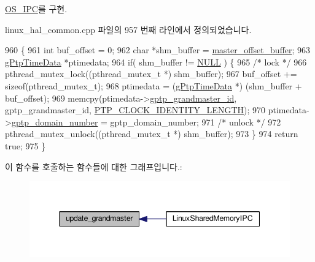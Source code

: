 \hyperlink{class_o_s___i_p_c_a322c3dc7306144448f366a525f634fdf}{O\+S\+\_\+\+I\+PC}를 구현.



linux\+\_\+hal\+\_\+common.\+cpp 파일의 957 번째 라인에서 정의되었습니다.


\begin{DoxyCode}
960 \{
961     \textcolor{keywordtype}{int} buf\_offset = 0;
962     \textcolor{keywordtype}{char} *shm\_buffer = \hyperlink{class_linux_shared_memory_i_p_c_a028459163bd8b988344f6837036cb0be}{master\_offset\_buffer};
963     \hyperlink{structg_ptp_time_data}{gPtpTimeData} *ptimedata;
964     \textcolor{keywordflow}{if}( shm\_buffer != \hyperlink{openavb__types__base__pub_8h_a070d2ce7b6bb7e5c05602aa8c308d0c4}{NULL} ) \{
965         \textcolor{comment}{/* lock */}
966         pthread\_mutex\_lock((pthread\_mutex\_t *) shm\_buffer);
967         buf\_offset += \textcolor{keyword}{sizeof}(pthread\_mutex\_t);
968         ptimedata   = (\hyperlink{structg_ptp_time_data}{gPtpTimeData} *) (shm\_buffer + buf\_offset);
969         memcpy(ptimedata->\hyperlink{structg_ptp_time_data_a91da646ac8f2da272fe3b8941c3f4d54}{gptp\_grandmaster\_id}, gptp\_grandmaster\_id, 
      \hyperlink{ptptypes_8hpp_afd1566058ed7927c2b790c9d4a0051ec}{PTP\_CLOCK\_IDENTITY\_LENGTH});
970         ptimedata->\hyperlink{structg_ptp_time_data_ac53b4e61c0f960e16c86cfe678ca256d}{gptp\_domain\_number} = gptp\_domain\_number;
971         \textcolor{comment}{/* unlock */}
972         pthread\_mutex\_unlock((pthread\_mutex\_t *) shm\_buffer);
973     \}
974     \textcolor{keywordflow}{return} \textcolor{keyword}{true};
975 \}
\end{DoxyCode}


이 함수를 호출하는 함수들에 대한 그래프입니다.\+:
\nopagebreak
\begin{figure}[H]
\begin{center}
\leavevmode
\includegraphics[width=344pt]{class_linux_shared_memory_i_p_c_ab4218ec21d3322c365b300cfdb23b263_icgraph}
\end{center}
\end{figure}


